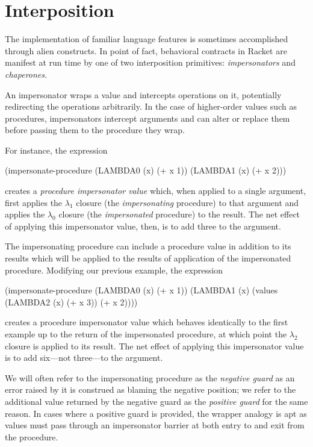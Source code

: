 \documentclass{sigplanconf}
\begin{document}


\section{Interposition}

The implementation of familiar language features is sometimes accomplished through alien constructs.
In point of fact, behavioral contracts in Racket are manifest at run time by one of two interposition primitives: \emph{impersonators} and \emph{chaperones}.

An impersonator wraps a value and intercepts operations on it, potentially redirecting the operations arbitrarily.
In the case of higher-order values such as procedures, impersonators intercept arguments and can alter or replace them before passing them to the procedure they wrap.

For instance, the expression
\begin{schemedisplay}
(impersonate-procedure (LAMBDA0 (x) (+ x 1)) (LAMBDA1 (x) (+ x 2)))
\end{schemedisplay}
creates a \emph{procedure impersonator value} which, when applied to a single argument, first applies the $\lambda_1$ closure (the \emph{impersonating} procedure) to that argument and applies the $\lambda_0$ closure (the \emph{impersonated} procedure) to the result.
The net effect of applying this impersonator value, then, is to add three to the argument.

The impersonating procedure can include a procedure value in addition to its results which will be applied to the results of application of the impersonated procedure.
Modifying our previous example, the expression
\begin{schemedisplay}
(impersonate-procedure (LAMBDA0 (x) (+ x 1))
                       (LAMBDA1 (x) (values (LAMBDA2 (x) (+ x 3)) (+ x 2))))
\end{schemedisplay}
creates a procedure impersonator value which behaves identically to the first example up to the return of the impersonated procedure, at which point the $\lambda_2$ closure is applied to its result.
The net effect of applying this impersonator value is to add six---not three---to the argument.

We will often refer to the impersonating procedure as the \emph{negative guard} as an error raised by it is construed as blaming the negative position; we refer to the additional value returned by the negative guard as the \emph{positive guard} for the same reason.
In cases where a positive guard is provided, the wrapper analogy is apt as values must pass through an impersonator barrier at both entry to and exit from the procedure.
\end{document}
